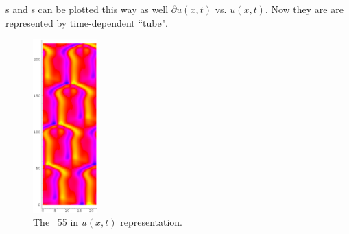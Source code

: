 \Po s and \Rpo s can be plotted this way as well
$\partial u(x,t)$ vs. $u(x,t)$. Now they are are represented by time-dependent
``tube".



\begin{figure}[t] %
\centering
 	\includegraphics[width=2.5cm]{figs/rpo22-55-4-u.eps}
\hspace{0.1in}
\caption{
 The \rpo\ {\nameit}55 in $u(x,t)$ representation. 
        }
\label{f:rpo55u}
\end{figure}


